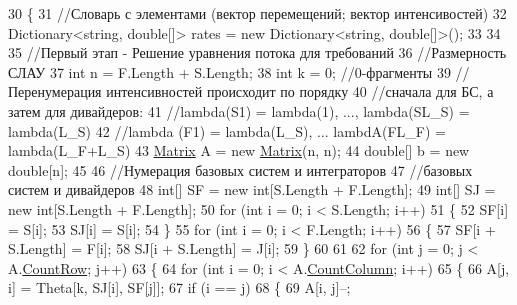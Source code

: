 \begin{DoxyCode}
30         \{
31             \textcolor{comment}{//Словарь с элементами (вектор перемещений; вектор интенсивостей)}
32             Dictionary<string, double[]> rates = \textcolor{keyword}{new} Dictionary<string, double[]>();
33 
34 
35             \textcolor{comment}{//Первый этап - Решение уравнения потока для требований}
36             \textcolor{comment}{//Размерность СЛАУ}
37             \textcolor{keywordtype}{int} n = F.Length + S.Length;
38             \textcolor{keywordtype}{int} k = 0; \textcolor{comment}{//0-фрагменты }
39             \textcolor{comment}{//Перенумерация интенсивностей происходит по порядку }
40             \textcolor{comment}{//сначала для БС, а затем для дивайдеров:}
41             \textcolor{comment}{//lambda(S1) = lambda(1), ..., lambda(SL\_S) =  lambda(L\_S)}
42             \textcolor{comment}{//lambda (F1) = lambda(L\_S), ... lambdA(FL\_F) = lambda(L\_F+L\_S)}
43             \hyperlink{class_b_l_a_s_1_1_matrix}{Matrix} A = \textcolor{keyword}{new} \hyperlink{class_b_l_a_s_1_1_matrix}{Matrix}(n, n);
44             \textcolor{keywordtype}{double}[] b = \textcolor{keyword}{new} \textcolor{keywordtype}{double}[n];
45 
46             \textcolor{comment}{//Нумерация базовых систем и интеграторов}
47             \textcolor{comment}{//базовых систем и дивайдеров}
48             \textcolor{keywordtype}{int}[] SF = \textcolor{keyword}{new} \textcolor{keywordtype}{int}[S.Length + F.Length];
49             \textcolor{keywordtype}{int}[] SJ = \textcolor{keyword}{new} \textcolor{keywordtype}{int}[S.Length + F.Length];
50             \textcolor{keywordflow}{for} (\textcolor{keywordtype}{int} i = 0; i < S.Length; i++)
51             \{
52                 SF[i] = S[i];
53                 SJ[i] = S[i];
54             \}
55             \textcolor{keywordflow}{for} (\textcolor{keywordtype}{int} i = 0; i < F.Length; i++)
56             \{
57                 SF[i + S.Length] = F[i];
58                 SJ[i + S.Length] = J[i];
59             \}
60 
61 
62             \textcolor{keywordflow}{for} (\textcolor{keywordtype}{int} j = 0; j < A.\hyperlink{class_b_l_a_s_1_1_matrix_a511a107843f7d488a87a7f01a184e893}{CountRow}; j++)
63             \{
64                 \textcolor{keywordflow}{for} (\textcolor{keywordtype}{int} i = 0; i < A.\hyperlink{class_b_l_a_s_1_1_matrix_aae67f388c0c049518adc10781e29d091}{CountColumn}; i++)
65                 \{
66                     A[j, i] = Theta[k, SJ[i], SF[j]];
67                     \textcolor{keywordflow}{if} (i == j)
68                     \{
69                         A[i, j]--;

\end{DoxyCode}
